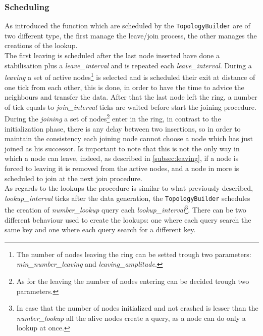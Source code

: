 \documentclass[11pt,twocolumn,letterpaper]{article}
\begin{document}
	\subsubsection{Scheduling}
	\label{subsubsec:top-scheduling}
	As introduced the function which are scheduled by the \texttt{TopologyBuilder} are of two different type, the first manage the leave/join process, the other manages the creations of the lookup.\\
	The first leaving is scheduled after the last node inserted have done a stabilisation plus a \textit{leave\_interval} and is repeated each \textit{leave\_interval}. During a \textit{leaving} a set of active nodes\footnote{The number of nodes leaving the ring can be setted trough two parameters: \textit{min\_number\_leaving} and \textit{leaving\_amplitude}.} is selected and is scheduled their exit at distance of one tick from each other, this is done, in order to have the time to advice the neighbours and transfer the data. After that the last node left the ring, a number of tick equals to \textit{join\_interval} ticks are waited before start the joining procedure. During the \textit{joining} a set of nodes\footnote{As for the leaving the number of nodes entering can be decided trough two parameters.} enter in the ring, in contrast to the initialization phase, there is any delay between two insertions, so in order to maintain the consistency each joining node cannot choose a node which has just joined as his successor.
	Is important to note that this is not the only way in which a node can leave, indeed, as described in \cref{subsec:leaving}, if a node is forced to leaving it is removed from the active nodes, and a node in more is scheduled to join at the next join procedure.\\
	As regards to the lookups the procedure is similar to what previously described, \textit{lookup\_interval} ticks after the data generation, the \texttt{TopologyBuilder} schedules the creation of \textit{number\_lookup} query each \textit{lookup\_interval}\footnote{In case that the number of nodes initialized and not crashed is lesser than the \textit{number\_lookup} all the alive nodes create a query, as a node can do only a lookup at once.}. There can be two different behaviour used to create the lookups: one where each query search the same key and one where each query search for a different key.
	
	
\end{document}
